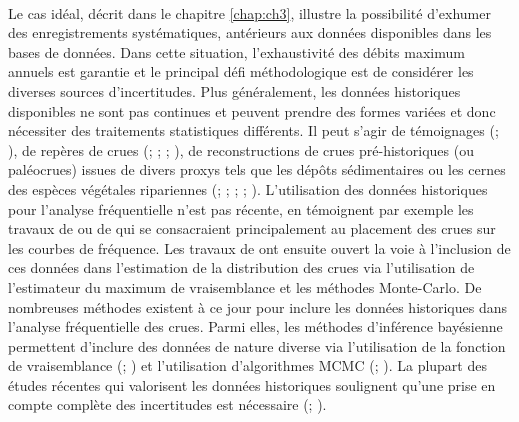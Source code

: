 	\paragraph{} Le cas idéal, décrit dans le chapitre \ref{chap:ch3}, illustre la possibilité d'exhumer des enregistrements systématiques, antérieurs aux données disponibles dans les bases de données. Dans cette situation, l'exhaustivité des débits maximum annuels est garantie et le principal défi méthodologique est de considérer les diverses sources d'incertitudes. Plus généralement, les données historiques disponibles ne sont pas continues et peuvent prendre des formes variées et donc nécessiter des traitements statistiques différents. Il peut s'agir de témoignages (\cite{pichard_les_1995}; \cite{kjeldsen_documentary_2014}), de repères de crues (\cite{parkes_defining_2016}; \cite{piotte_collection_2016}; \cite{engeland_new_2020}; \cite{medd_reperes_2023}), de reconstructions de crues pré-historiques (ou paléocrues) issues de divers proxys tels que les dépôts sédimentaires ou les cernes des espèces végétales ripariennes (\cite{stedinger_flood_1986}; \cite{benito_use_2004}; \cite{dezileau_multidating_2014}; \cite{st_george_paleofloods_2020}; \cite{engeland_new_2020}). L'utilisation des données historiques pour l'analyse fréquentielle n'est pas récente, en témoignent par exemple les travaux de \citet{benson_use_1950} ou de \citet{hirsch_plotting_1987} qui se consacraient principalement au placement des crues sur les courbes de fréquence. Les travaux de \citet{stedinger_flood_1986} ont ensuite ouvert la voie à l'inclusion de ces données dans l'estimation de la distribution des crues via l'utilisation de l'estimateur du maximum de vraisemblance et les méthodes Monte-Carlo. De nombreuses méthodes existent à ce jour pour inclure les données historiques dans l'analyse fréquentielle des crues. Parmi elles, les méthodes d'inférence bayésienne permettent d'inclure des données de nature diverse via l'utilisation de la fonction de vraisemblance (\cite{stedinger_flood_1986}; \cite{kuczera_comprehensive_1999}) et l'utilisation d'algorithmes MCMC (\cite{reis_bayesian_2005}; \cite{renard_application_2006}). La plupart des études récentes qui valorisent les données historiques soulignent qu'une prise en compte complète des incertitudes est nécessaire (\cite{neppel_flood_2010}; \cite{parkes_defining_2016}).
	
